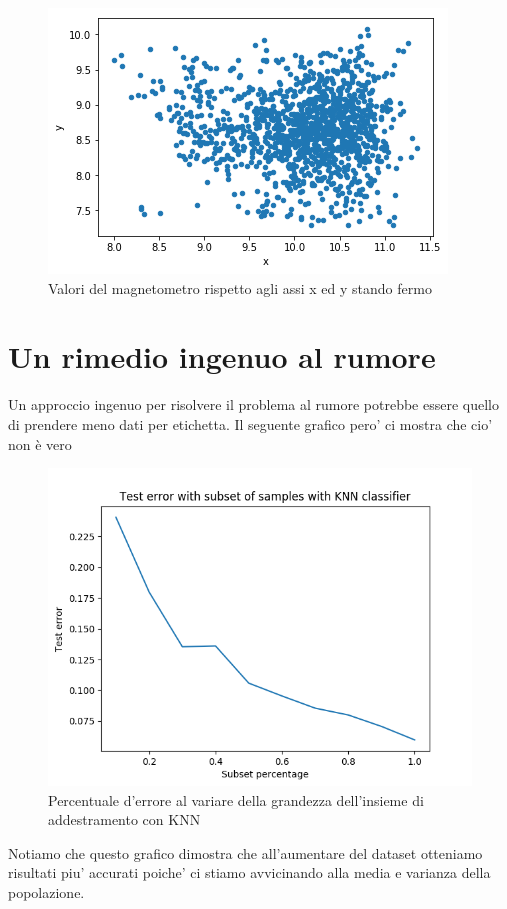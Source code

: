 \begin{figure}[H]
	\centering
	\includegraphics[width=0.7\linewidth]{img/xystand}
	\caption{Valori del magnetometro rispetto agli assi x ed y stando fermo}
	\label{fig:xystand}
\end{figure}



\section{Un rimedio ingenuo al rumore}
Un approccio ingenuo per risolvere il problema al rumore potrebbe essere quello di prendere meno dati per etichetta. Il seguente grafico pero' ci mostra che cio' non \`e vero

\begin{figure}[H]
	\centering
	\includegraphics[width=0.7\linewidth]{img/rumor_graph_knn}
	\caption{Percentuale d'errore al variare della grandezza dell'insieme di addestramento con KNN}
	\label{fig:rumorgraphknn}
\end{figure}

Notiamo che questo grafico dimostra che all'aumentare del dataset otteniamo risultati piu' accurati poiche' ci stiamo avvicinando alla media e varianza della popolazione.

